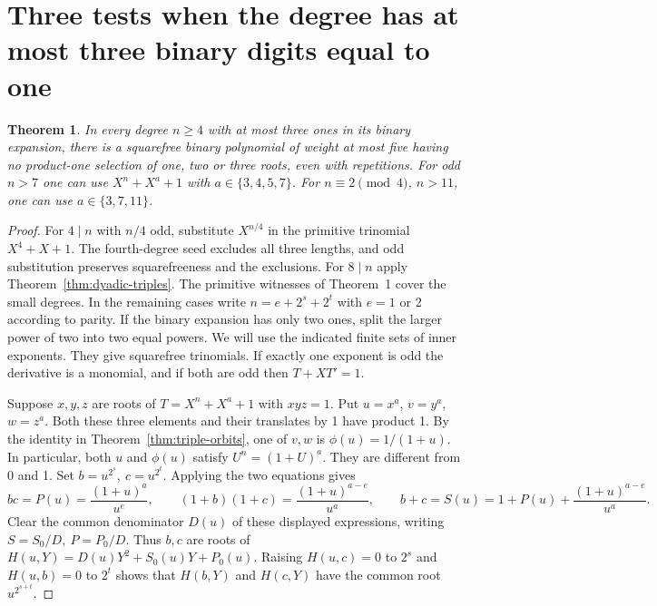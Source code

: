 \documentclass[11pt]{article}
\newtheorem{theorem}{Theorem}
\begin{document}
\section{Three tests when the degree has at most three binary digits equal to one}
\begin{theorem}\label{thm:three-bits}
In every degree \(n\ge4\) with at most three ones in its binary expansion,
there is a squarefree binary polynomial of weight at most five having no
product-one selection of one, two or three roots, even with repetitions.
For odd \(n>7\) one can use \(X^n+X^a+1\) with
\(a\in\{3,4,5,7\}\). For \(n\equiv2\pmod4\), \(n>11\), one can use
\(a\in\{3,7,11\}\).
\end{theorem}
\begin{proof}
For \(4\mid n\) with \(n/4\) odd, substitute \(X^{n/4}\) in the primitive
trinomial \(X^4+X+1\). The fourth-degree seed excludes all three lengths,
and odd substitution preserves squarefreeness and the exclusions.
For \(8\mid n\) apply Theorem~\ref{thm:dyadic-triples}. The primitive
witnesses of Theorem~1 cover the small degrees. In the remaining cases
write \(n=e+2^s+2^t\) with \(e=1\) or 2 according to parity. If the
binary expansion has only two ones, split the larger power of two into
two equal powers. We will use the indicated finite sets of inner exponents.
They give squarefree trinomials. If exactly one exponent is odd the
derivative is a monomial, and if both are odd then \(T+XT'=1\).

Suppose \(x,y,z\) are roots of \(T=X^n+X^a+1\) with \(xyz=1\).
Put \(u=x^a\), \(v=y^a\), \(w=z^a\). Both these three elements and
their translates by 1 have product 1. By the identity in
Theorem~\ref{thm:triple-orbits}, one of \(v,w\) is
\(\phi(u)=1/(1+u)\). In particular, both \(u\) and \(\phi(u)\)
satisfy \(U^n=(1+U)^a\). They are different from 0 and 1.
Set \(b=u^{2^s},\ c=u^{2^t}\). Applying the two equations gives
\[
 bc=P(u)=\frac{(1+u)^a}{u^e},\qquad
 (1+b)(1+c)=\frac{(1+u)^{a-e}}{u^a},\qquad
 b+c=S(u)=1+P(u)+\frac{(1+u)^{a-e}}{u^a}.
\]
Clear the common denominator \(D(u)\) of these displayed expressions,
writing \(S=S_0/D,\ P=P_0/D\). Thus \(b,c\) are roots of
\(H(u,Y)=D(u)Y^2+S_0(u)Y+P_0(u)\).
Raising \(H(u,c)=0\) to \(2^s\) and \(H(u,b)=0\) to \(2^t\) shows
that \(H(b,Y)\) and \(H(c,Y)\) have the common root \(u^{2^{s+t}}\).


\end{proof}
\end{document}
